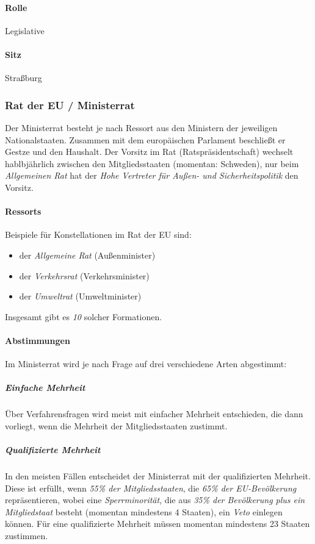 \documentclass{article}
\begin{document}
	\paragraph{Rolle}
	Legislative

	\paragraph{Sitz}
	Straßburg

	\subsubsection{Rat der EU / Ministerrat}
	Der Ministerrat besteht je nach Ressort aus den Ministern der jeweiligen Nationalstaaten. Zusammen mit dem europäischen Parlament beschließt er Gestze und den Haushalt. Der Vorsitz im Rat (Ratspräsidentschaft) wechselt hablbjährlich zwischen den Mitgliedsstaaten (momentan: Schweden), nur beim \textit{Allgemeinen Rat} hat der \textit{Hohe Vertreter für Außen- und Sicherheitspolitik} den Vorsitz.

	\paragraph{Ressorts}
	Beispiele für Konstellationen im Rat der EU sind:
	\begin{itemize}
		\item der \textit{Allgemeine Rat} (Außenminister)
		\item der \textit{Verkehrsrat} (Verkehrsminister)
		\item der \textit{Umweltrat} (Umweltminister)
	\end{itemize}

	Insgesamt gibt es \textit{10} solcher Formationen. 

	\paragraph{Abstimmungen}
	Im Ministerrat wird je nach Frage auf drei verschiedene Arten abgestimmt:

	\subparagraph{Einfache Mehrheit}
	Über Verfahrensfragen wird meist mit einfacher Mehrheit entschieden, die dann vorliegt, wenn die Mehrheit der Mitgliedsstaaten zustimmt.

	 \subparagraph{Qualifizierte Mehrheit}
	 In den meisten Fällen entscheidet der Ministerrat mit der qualifizierten Mehrheit. Diese ist erfüllt, wenn \textit{55\% der Mitgliedsstaaten}, die \textit{65\% der EU-Bevölkerung} repräsentieren, wobei eine \textit{Sperrminorität}, die aus \textit{35\% der Bevölkerung plus ein Mitgliedstaat} besteht (momentan mindestens 4 Staaten), ein \textit{Veto} einlegen können. Für eine qualifizierte Mehrheit müssen momentan mindestens 23 Staaten zustimmen.
\end{document}
